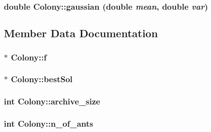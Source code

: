 \hypertarget{classColony_392a128abc861f658f92aa98f6c21585}{
\subsubsection{\setlength{\rightskip}{0pt plus 5cm}double Colony::gaussian (double {\em mean}, \/  double {\em var})}}
\label{classColony_392a128abc861f658f92aa98f6c21585}




\subsection{Member Data Documentation}
\hypertarget{classColony_bf5614747e9e944cd2af6ffa83e3cf38}{
\subsubsection{$\ast$ {\bf Colony::f}}}
\label{classColony_bf5614747e9e944cd2af6ffa83e3cf38}


\hypertarget{classColony_3030d0a11898b83414df4a3f8878c141}{
\subsubsection{$\ast$ {\bf Colony::bestSol}}}
\label{classColony_3030d0a11898b83414df4a3f8878c141}


\hypertarget{classColony_6ab1bba15c25d8c2e38e2a3632d63661}{
\subsubsection{\setlength{\rightskip}{0pt plus 5cm}int {\bf Colony::archive\_\-size}}}
\label{classColony_6ab1bba15c25d8c2e38e2a3632d63661}


\hypertarget{classColony_5398847209293075291ecec0c242b19e}{
\subsubsection{\setlength{\rightskip}{0pt plus 5cm}int {\bf Colony::n\_\-of\_\-ants}}}
\label{classColony_5398847209293075291ecec0c242b19e}


